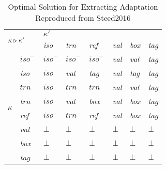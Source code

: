 \begin{table}[H]
\centering
\begin{tabular}{ll|llllll}
\multicolumn{2}{l|}{\multirow{2}{*}{$\kappa \extract \kappa'$}} & \multicolumn{6}{l}{\hfill$\kappa'$\hfill}                                                                \\
\multicolumn{2}{l|}{}                                            & \textit{iso}  & \textit{trn}  & \textit{ref}  & \textit{val} & \textit{box} & \textit{tag} \\ \hline
\multirow{8}{*}{$\kappa$}              & $\textit{iso}^-$       & $\textit{iso}^-$ & $\textit{iso}^-$ & $\textit{iso}^-$ & \textit{val} & \textit{val} & \textit{tag} \\ \cline{2-8} 
                                    & \textit{iso}               & $\textit{iso}^-$  & \textit{val}  & \textit{tag}  & \textit{val} & \textit{tag} & \textit{tag} \\ \cline{2-8} 
                                    & $\textit{trn}^-$              & $\textit{iso}^-$ & $\textit{trn}^-$ & $\textit{trn}^-$ & \textit{val} & \textit{val} & \textit{tag} \\ \cline{2-8} 
                                    & \textit{trn}               & $\textit{iso}^-$  & \textit{val}  & \textit{box}  & \textit{val} & \textit{box} & \textit{tag} \\ \cline{2-8} 
                                    & \textit{ref}               & $\textit{iso}^-$  & $\textit{trn}^-$  & \textit{ref}  & \textit{val} & \textit{box} & \textit{tag} \\ \cline{2-8} 
                                    & \textit{val}               & $\bot$        & $\bot$        & $\bot$        & $\bot$       & $\bot$       & $\bot$       \\ \cline{2-8} 
                                    & \textit{box}               & $\bot$        & $\bot$        & $\bot$        & $\bot$       & $\bot$       & $\bot$       \\ \cline{2-8} 
                                    & \textit{tag}               & $\bot$        & $\bot$        & $\bot$        & $\bot$       & $\bot$       & $\bot$      
\end{tabular}
\caption{Optimal Solution for Extracting Adaptation \\ Reproduced from Steed2016}
\end{table}